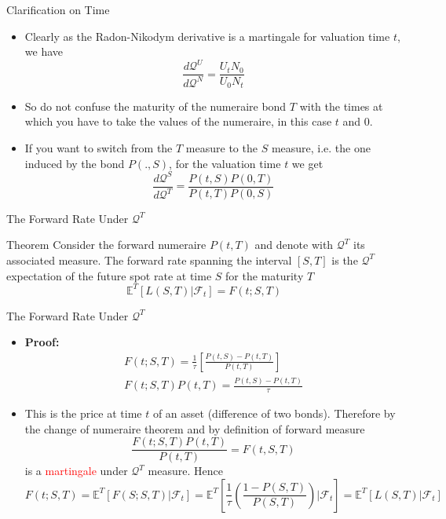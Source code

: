 \documentclass{beamer}
\begin{document}
\begin{frame}{Clarification on Time}
	\begin{itemize}
		\item Clearly as the Radon-Nikodym derivative is a martingale for valuation time $t$, we have
		\begin{equation}
			\frac{d\mathcal{Q}^U}{d\mathcal{Q}^N}=\frac{U_tN_0}{U_0N_t}
		\end{equation}
		\item So do not confuse the maturity of the numeraire bond $T$ with the times at which you have to take the values of the numeraire, in this case $t$ and 0.
		\item If you want to switch from the $T$ measure to the $S$ measure, i.e. the one induced by the bond $P(.,S)$, for the valuation time $t$ we get
		\begin{equation}
			\frac{d\mathcal{Q}^S}{d\mathcal{Q}^T}=\frac{P(t,S)P(0,T)}{P(t,T)P(0,S)}
		\end{equation}
	\end{itemize}
\end{frame}

\begin{frame}{The Forward Rate Under $\mathcal{Q}^T$}
	\begin{block}{Theorem}
		Consider the forward numeraire $P(t,T)$ and denote with $\mathcal{Q}^T$ its associated measure.
		The forward rate spanning the interval $[S,T]$ is the $\mathcal{Q}^T$ expectation of the future spot rate at time $S$ for the maturity $T$
		\begin{equation}
			\mathbb{E}^T[L(S,T)|\mathcal{F}_t] = F(t;S,T)
		\end{equation}
	\end{block}
\end{frame}

\begin{frame}{The Forward Rate Under $\mathcal{Q}^T$}
	\begin{itemize}
	\item \textbf{Proof:}
		\begin{equation*}
			\begin{gathered}
				F(t;S,T) = \frac{1}{\tau}\left[\frac{P(t,S)-P(t,T)}{P(t,T)}\right] \\[0.3cm]
				F(t;S,T)P(t,T) = \frac{P(t,S)-P(t,T)}{\tau}
			\end{gathered}
		\end{equation*}
	\item This is the price at time $t$ of an asset (difference of two bonds). Therefore by the change of numeraire theorem and by definition of forward measure
		\begin{equation*}
			\frac{F(t;S,T)P(t,T)}{P(t,T)} = F(t,S,T)
		\end{equation*}
		is a \textcolor{red}{martingale} under $\mathcal{Q}^T$ measure. Hence
		\begin{equation*}
			F(t;S,T) = \mathbb{E}^T[F(S;S,T)|\mathcal{F}_t] = \mathbb{E}^T\left[\frac{1}{\tau}\left(\frac{1-P(S,T)}{P(S,T)}\right)\bigg|\mathcal{F}_t\right] = \mathbb{E}^T[L(S,T)|\mathcal{F}_t]
		\end{equation*}
	\end{itemize}
\end{frame}
\end{document}
